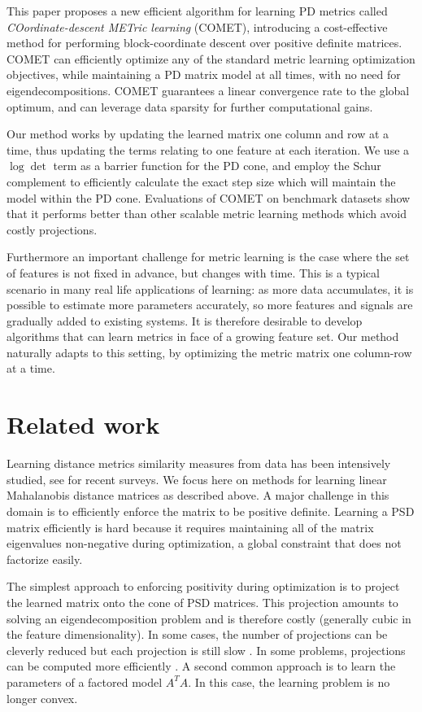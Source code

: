 \documentclass{article} %
\begin{document}
This paper proposes a new efficient algorithm for learning PD metrics called  {\em{COordinate-descent METric learning}} (COMET), introducing a cost-effective method for performing block-coordinate descent over positive definite matrices.
COMET can efficiently optimize any of the standard metric learning optimization objectives, while maintaining a PD matrix model at all times, with no need for eigendecompositions. COMET guarantees a linear convergence rate to the global optimum, and can leverage data sparsity for further computational gains. 

Our method works by updating the learned matrix one column and row at a time, thus updating the terms relating to one feature at each iteration. We use a $\log \det$ term as a barrier function for the PD cone, and employ the Schur complement to efficiently calculate the exact step size which will maintain the model within the PD cone. Evaluations of COMET on benchmark datasets show that it performs better than other scalable metric learning methods which avoid costly projections. 

Furthermore an important challenge for metric learning is the case where the set of features is not fixed in advance, but changes with time. This is a typical scenario in many real life applications of learning: as more data accumulates, it is possible to estimate more parameters accurately, so more features and signals are gradually added to existing systems. It is therefore desirable to develop algorithms that can learn metrics in face of a growing feature set. Our method naturally adapts to this setting, by optimizing the metric matrix one column-row at a time.



\section{Related work}
Learning distance metrics similarity measures from data has been intensively studied,  see \citet{bellet2013survey, kulis2012survey} for recent surveys. We focus here on methods for learning linear Mahalanobis distance matrices as described above. A major challenge in this domain is to efficiently enforce the matrix to be positive definite. Learning a PSD matrix efficiently is hard because it requires maintaining all of the matrix eigenvalues non-negative during optimization, a global constraint that does not factorize easily.

The simplest approach to enforcing positivity during optimization is to project the learned matrix onto the cone of PSD matrices. This projection amounts to solving an eigendecomposition problem and is therefore costly (generally cubic in the feature dimensionality). In some cases, the number of projections can be cleverly reduced but each projection is still slow \cite{qianHD, qian}. In some problems, projections can be computed more efficiently \cite{shalev2004online}. A second common approach is to learn the parameters of a factored model $A^TA$. In this case, the learning problem is no longer convex. 
\end{document}
